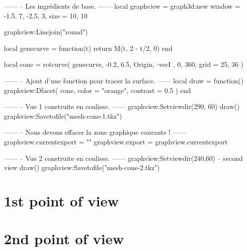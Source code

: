 \documentclass[varwidth, border = 3pt]{standalone}
\begin{document}
\begin{luadraw}{}
------
-- Les ingrédients de base.
------
local graphview = graph3d:new{
  window = {-1.5, 7, -2.5, 3},
  size   = {10, 10}
}

graphview:Linejoin("round")

local genecurve = function(t)
  return M(t, 2 - t/2, 0)
end

local cone = rotcurve(
  genecurve, -0.2, 6.5,
  {
    Origin, -vecI
  },
  0, 360,
  {
    grid = {25, 36}
  })

------
-- Ajout d'une fonction pour tracer la surface.
------
local draw = function()
  graphview:Dfacet(
    cone,
    {
      color  = "orange",
      contrast = 0.5
    })
end

------
-- Vue 1 construite en coulisse.
------
graphview:Setviewdir(290, 60)
draw()
graphview:Savetofile("mesh-cone-1.tkz")

------
-- Nous devons effacer la zone graphique courante !
------
graphview.currentexport = {""}
graphview.export        = graphview.currentexport

------
-- Vue 2 construite en coulisse.
------
graphview:Setviewdir(240,60) -- second view
draw()
graphview:Savetofile("mesh-cone-2.tkz")
\end{luadraw}

\section*{1st point of view}




\section*{2nd point of view}


\end{document}
